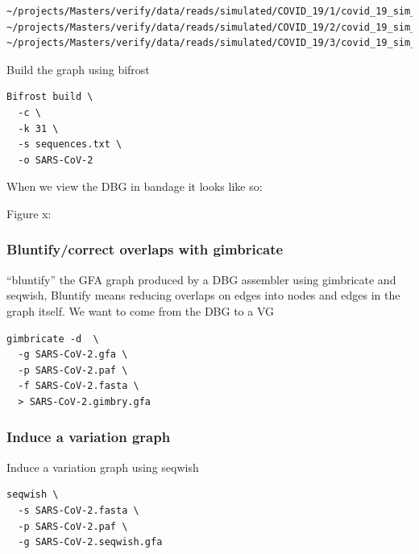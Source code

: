 \documentclass[a4paper]{article}
\begin{document}
\begin{verbatim}
~/projects/Masters/verify/data/reads/simulated/COVID_19/1/covid_19_sim_1_interleaved.fastq
~/projects/Masters/verify/data/reads/simulated/COVID_19/2/covid_19_sim_2_interleaved.fastq
~/projects/Masters/verify/data/reads/simulated/COVID_19/3/covid_19_sim_3_interleaved.fastq
\end{verbatim}

Build the graph using bifrost

\begin{verbatim}
Bifrost build \
  -c \
  -k 31 \
  -s sequences.txt \
  -o SARS-CoV-2
\end{verbatim}

When we view the DBG in bandage it looks like so:

Figure x:
\subsubsection{Bluntify/correct overlaps with gimbricate}
\label{sec:org0e14e05}
“bluntify” the GFA graph produced by a DBG assembler using gimbricate and seqwish, Bluntify means reducing overlaps on edges into nodes and edges in the graph itself.
We want to come from the DBG to a VG

\begin{verbatim}
gimbricate -d  \
  -g SARS-CoV-2.gfa \
  -p SARS-CoV-2.paf \
  -f SARS-CoV-2.fasta \
  > SARS-CoV-2.gimbry.gfa
\end{verbatim}

\subsubsection{Induce a variation graph}
\label{sec:orgcb520ea}
Induce a variation graph using seqwish

\begin{verbatim}
seqwish \
  -s SARS-CoV-2.fasta \
  -p SARS-CoV-2.paf \
  -g SARS-CoV-2.seqwish.gfa
\end{verbatim}
\end{document}
